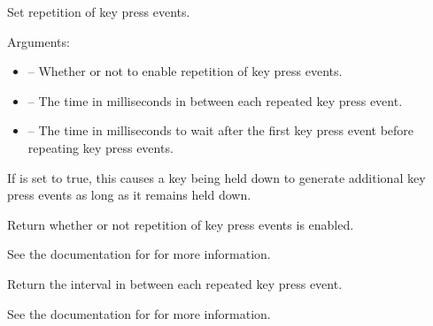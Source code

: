 \documentclass[letterpaper,10pt,english]{sphinxmanual}
\begin{document}

\begin{fulllineitems}
\label{keyboard:sge.keyboard.set_repeat}
Set repetition of key press events.

Arguments:
\begin{itemize}
\item {} 
 -- Whether or not to enable repetition of key press
events.

\item {} 
 -- The time in milliseconds in between each repeated
key press event.

\item {} 
 -- The time in milliseconds to wait after the first key
press event before repeating key press events.

\end{itemize}

If  is set to true, this causes a key being held down to
generate additional key press events as long as it remains held
down.

\end{fulllineitems}


\begin{fulllineitems}
\label{keyboard:sge.keyboard.get_repeat_enabled}
Return whether or not repetition of key press events is enabled.

See the documentation for {\hyperref[keyboard:sge.keyboard.set_repeat]{\emph{}}} for more
information.

\end{fulllineitems}


\begin{fulllineitems}
\label{keyboard:sge.keyboard.get_repeat_interval}
Return the interval in between each repeated key press event.

See the documentation for {\hyperref[keyboard:sge.keyboard.set_repeat]{\emph{}}} for more
information.

\end{fulllineitems}
\end{document}
